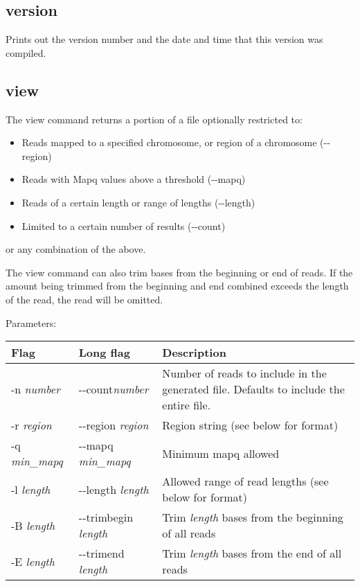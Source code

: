 \documentclass[11pt]{article}
\begin{document}
\subsection{version}
Prints out the version number and the date and time that this version was compiled.

\subsection{view}
The view command returns a portion of a file optionally restricted to:
\begin{itemize}
\item Reads mapped to a specified chromosome, or region of a chromosome ({-}{-}region)
\item Reads with Mapq values above a threshold ({-}{-}mapq)
\item Reads of a certain length or range of lengths ({-}{-}length)
\item Limited to a certain number of results ({-}{-}count)
\end{itemize}
or any combination of the above.

The view command can also trim bases from the beginning or end of reads. If the amount being trimmed from the beginning and end combined exceeds the length of the read, the read will be omitted.

Parameters:
\begin{center}
\begin{tabular}{llp{3.5in}}
\hline
Flag&Long flag&Description\\ \hline
-n \textit{number}&{-}{-}count\textit{number}&Number of reads to include in the generated file. Defaults to include the entire file.\\
-r \textit{region}&{-}{-}region \textit{region}&Region string (see below for format)\\
-q \textit{min\_mapq}&{-}{-}mapq \textit{min\_mapq}&Minimum mapq allowed\\
-l \textit{length}&{-}{-}length \textit{length}&Allowed range of read lengths (see below for format)\\
-B \textit{length}&{-}{-}trimbegin \textit{length}&Trim \textit{length} bases from the beginning of all reads\\
-E \textit{length}&{-}{-}trimend \textit{length}&Trim \textit{length} bases from the end of all reads\\
\end{tabular}
\end{center}
\end{document}
